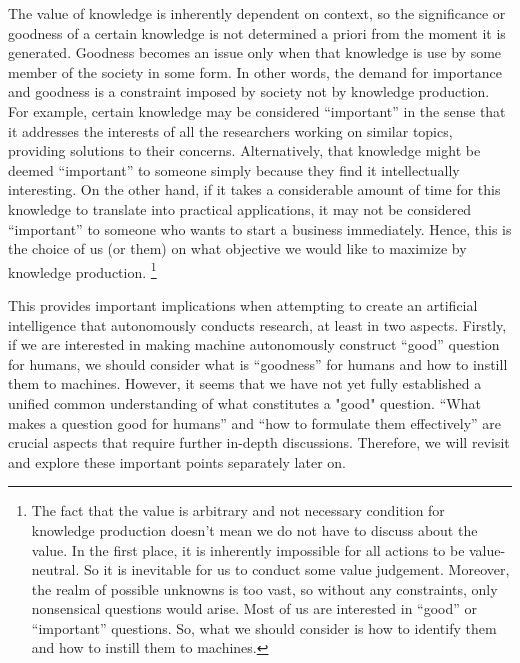 \documentclass{book}
\begin{document}
The value of knowledge is inherently dependent on context, so the significance or goodness of a certain knowledge is not determined a priori from the moment it is generated. Goodness becomes an issue only when that knowledge is use by some member of the society in some form. In other words, the demand for importance and goodness is a constraint imposed by society not by knowledge production. For example, certain knowledge may be considered ``important'' in the sense that it addresses the interests of all the researchers working on similar topics, providing solutions to their concerns. Alternatively, that knowledge might be deemed ``important'' to someone simply because they find it intellectually interesting. On the other hand, if it takes a considerable amount of time for this knowledge to translate into practical applications, it may not be considered ``important'' to someone who wants to start a business immediately. Hence, this is the choice of us (or them) on what objective we would like to maximize by knowledge production. \footnote{
The fact that the value is arbitrary and not necessary condition for knowledge production doesn't mean we do not have to discuss about the value. In the first place, it is inherently impossible for all actions to be value-neutral. So it is inevitable for us to conduct some value judgement. Moreover, the realm of possible unknowns is too vast, so without any constraints, only nonsensical questions would arise. Most of us are interested in ``good'' or ``important'' questions. So, what we should consider is how to identify them and how to instill them to machines.
}

This provides important implications when attempting to create an artificial intelligence that autonomously conducts research, at least in two aspects. Firstly, if we are interested in making machine autonomously construct ``good'' question for humans, we should consider what is ``goodness'' for humans and how to instill them to machines. However, it seems that we have not yet fully established a unified common understanding of what constitutes a "good" question. ``What makes a question good for humans'' and ``how to formulate them effectively'' are crucial aspects that require further in-depth discussions. Therefore, we will revisit and explore these important points separately later on.

\end{document}
